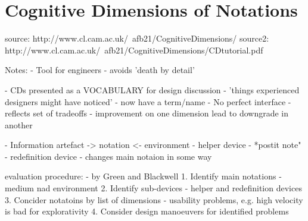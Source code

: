 \section{Cognitive Dimensions of Notations}

source: http://www.cl.cam.ac.uk/~afb21/CognitiveDimensions/
source2: http://www.cl.cam.ac.uk/~afb21/CognitiveDimensions/CDtutorial.pdf

Notes: 
- Tool for engineers
- avoids 'death by detail'

- CDs presented as a VOCABULARY for design discussion
- 'things experienced designers might have noticed' - now have a term/name
- No perfect interface - reflects set of tradeoffs
- improvement on one dimension lead to downgrade in another

- Information artefact -> notation <- environment
  - helper device - *postit note"
  - redefinition device - changes main notaion in some way

evaluation procedure: - by Green and Blackwell
1. Identify main notations - medium nad environment
2. Identify sub-devices - helper and redefinition devices
3. Concider notatoins by list of dimensions
   - usability problems, e.g. high velocity is bad for explorativity
4. Consider design manoeuvers for identified problems

